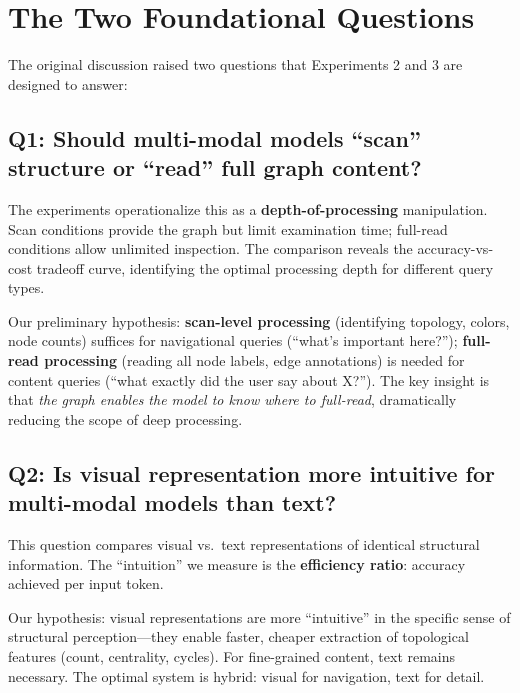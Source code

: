 \documentclass[11pt,a4paper]{article}
\begin{document}
\section{The Two Foundational Questions}

The original discussion raised two questions that Experiments 2 and 3 are designed to answer:

\subsection{Q1: Should multi-modal models ``scan'' structure or ``read'' full graph content?}

The experiments operationalize this as a \textbf{depth-of-processing} manipulation. Scan conditions provide the graph but limit examination time; full-read conditions allow unlimited inspection. The comparison reveals the accuracy-vs-cost tradeoff curve, identifying the optimal processing depth for different query types.

Our preliminary hypothesis: \textbf{scan-level processing} (identifying topology, colors, node counts) suffices for navigational queries (``what's important here?''); \textbf{full-read processing} (reading all node labels, edge annotations) is needed for content queries (``what exactly did the user say about X?''). The key insight is that \textit{the graph enables the model to know where to full-read}, dramatically reducing the scope of deep processing.

\subsection{Q2: Is visual representation more intuitive for multi-modal models than text?}

This question compares visual vs.\ text representations of identical structural information. The ``intuition'' we measure is the \textbf{efficiency ratio}: accuracy achieved per input token.

Our hypothesis: visual representations are more ``intuitive'' in the specific sense of structural perception---they enable faster, cheaper extraction of topological features (count, centrality, cycles). For fine-grained content, text remains necessary. The optimal system is hybrid: visual for navigation, text for detail.


\end{document}
